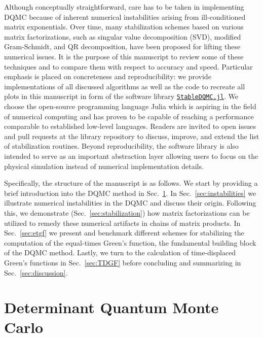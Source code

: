 \documentclass[submission, Phys]{SciPost}
\begin{document}
Although conceptually straightforward, care has to be taken in implementing DQMC because of inherent numerical instabilities arising from ill-conditioned matrix exponentials. Over time, many stabilization schemes \cite{Loh1989, Loh2005, Bai2011, Sorella1989, Assaad2002a} based on various matrix factorizations, such as singular value decomposition (SVD), modified Gram-Schmidt, and QR decomposition, have been proposed for lifting these numerical issues. It is the purpose of this manuscript to review some of these techniques and to compare them with respect to accuracy and speed. Particular emphasis is placed on concreteness and reproducibility: we provide implementations of all discussed algorithms as well as the code to recreate all plots in this manuscript in form of the software library \href{http://github.com/crstnbr/StableDQMC.jl}{\texttt{StableDQMC.jl}}. We choose the open-source programming language Julia\cite{Bezanson2017} which is aspiring \cite{JuliaNature2019} in the field of numerical computing and has proven \cite{diffeqbench, Luo2019} to be capable of reaching a performance comparable to established low-level languages. Readers are invited to open issues and pull requests at the library repository to discuss, improve, and extend the list of stabilization routines. Beyond reproducibility, the software library is also intended to serve as an important abstraction layer allowing users to focus on the physical simulation instead of numerical implementation details.

Specifically, the structure of the manuscript is as follows. We start by providing a brief introduction into the DQMC method in Sec.~\ref{sec:QMC}. In Sec.~\ref{sec:instabilities} we illustrate numerical instabilities in the DQMC and discuss their origin. Following this, we demonstrate (Sec.~\ref{sec:stabilization}) how matrix factorizations can be utilized to remedy these numerical artifacts in chains of matrix products. In Sec.~\ref{sec:etgf} we present and benchmark different schemes for stabilizing the computation of the equal-times Green's function, the fundamental building block of the DQMC method. Lastly, we turn to the calculation of time-displaced Green's functions in Sec.~\ref{sec:TDGF} before concluding and summarizing in Sec.~\ref{sec:discussion}.

\section{Determinant Quantum Monte Carlo}\label{sec:QMC}
\end{document}
